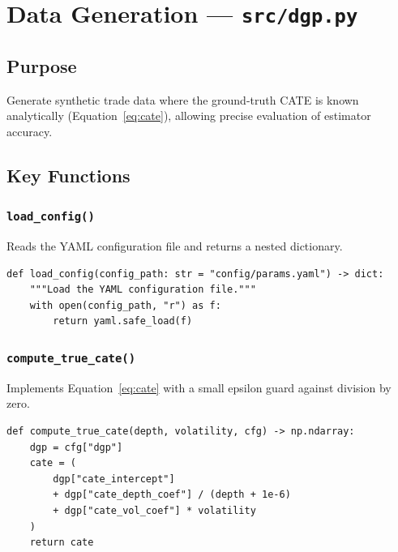 \documentclass[11pt, letterpaper]{article}
\begin{document}
\newpage
\section{Data Generation --- \texttt{src/dgp.py}}
\label{sec:dgp}

\subsection{Purpose}

Generate synthetic trade data where the ground-truth CATE is known analytically (Equation~\ref{eq:cate}), allowing precise evaluation of estimator accuracy.

\subsection{Key Functions}

\subsubsection{\texttt{load\_config()}}
Reads the YAML configuration file and returns a nested dictionary.

\begin{lstlisting}[caption={Configuration loader.}]
def load_config(config_path: str = "config/params.yaml") -> dict:
    """Load the YAML configuration file."""
    with open(config_path, "r") as f:
        return yaml.safe_load(f)
\end{lstlisting}

\subsubsection{\texttt{compute\_true\_cate()}}
Implements Equation~\ref{eq:cate} with a small epsilon guard against division by zero.

\begin{lstlisting}[caption={Ground-truth CATE computation.}]
def compute_true_cate(depth, volatility, cfg) -> np.ndarray:
    dgp = cfg["dgp"]
    cate = (
        dgp["cate_intercept"]
        + dgp["cate_depth_coef"] / (depth + 1e-6)
        + dgp["cate_vol_coef"] * volatility
    )
    return cate
\end{lstlisting}
\end{document}
